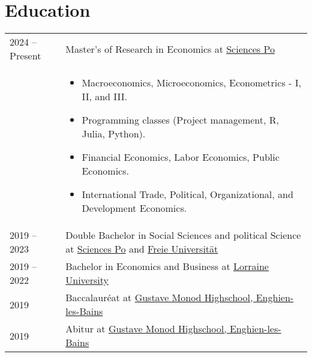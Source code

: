 \documentclass[a4paper,12pt]{article}
\begin{document}
\section{Education}
\begin{tabularx}{\linewidth}{@{}l X@{}}	

2024 – Present & Master's of Research in Economics at \href{https://www.sciencespo.fr/en/}{Sciences Po} \\
& \begin{itemize}
    \item Macroeconomics, Microeconomics, Econometrics - I, II, and III.
    \item Programming classes (Project management, R, Julia, Python).
    \item Financial Economics, Labor Economics, Public Economics.
    \item International Trade, Political, Organizational, and Development Economics.
\end{itemize} \\

2019 – 2023 & Double Bachelor in Social Sciences and political Science at \href{https://www.sciencespo.fr/en/}{Sciences Po} and \href{https://www.fu-berlin.de/en/index.html}{Freie Universität}\\

2019 – 2022 & Bachelor in Economics and Business at \href{https://www.univ-lorraine.fr/en/}{Lorraine University}\\

2019 & Baccalauréat at \href{https://www.lyc-polyvalent-monod-enghien.fr/}{Gustave Monod Highschool, Enghien-les-Bains} \hfill \\

2019 & Abitur at \href{https://www.lyc-polyvalent-monod-enghien.fr/}{Gustave Monod Highschool, Enghien-les-Bains} \hfill \\

\end{tabularx}

\end{document}
